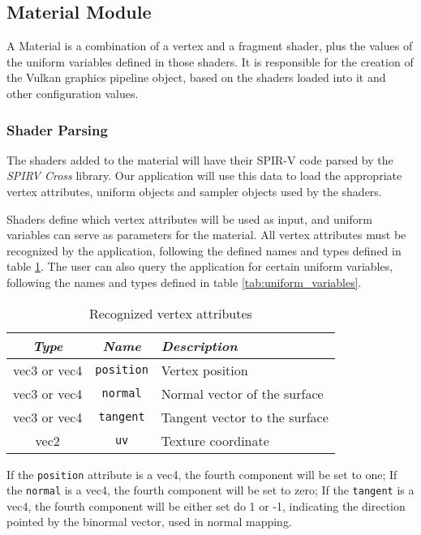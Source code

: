 \subsection{Material Module}
A Material is a combination of a vertex and a fragment shader, plus the values of the uniform variables defined in those shaders. It is responsible for the creation of the Vulkan graphics pipeline object, based on the shaders loaded into it and other configuration values.

\subsubsection{Shader Parsing}
The shaders added to the material will have their SPIR-V code parsed by the \emph{SPIRV Cross} library. Our application will use this data to load the appropriate vertex attributes, uniform objects and sampler objects used by the shaders.

Shaders define which vertex attributes will be used as input, and uniform variables can serve as parameters for the material. All vertex attributes must be recognized by the application, following the defined names and types defined in table \ref{tab:vertex_attributes}. The user can also query the application for certain uniform variables, following the names and types defined in table \ref{tab:uniform_variables}.

\begin{table}[h]
    \centering
    \caption{Recognized vertex attributes}
    \begin{tabular}{|c|c|p{6cm}|}
    \hline
        \textit{Type} & \textit{Name} & \textit{Description} \\
        \hline \hline
        vec3 or vec4 & \texttt{position} & Vertex position \\
        vec3 or vec4 & \texttt{normal} & Normal vector of the surface \\
        vec3 or vec4 & \texttt{tangent} & Tangent vector to the surface \\
        vec2 & \texttt{uv} & Texture coordinate \\
        \hline
    \end{tabular}
    \label{tab:vertex_attributes}
\end{table}

If the \texttt{position} attribute is a vec4, the fourth component will be set to one; If the \texttt{normal} is a vec4, the fourth component will be set to zero; If the \texttt{tangent} is a vec4, the fourth component will be either set do 1 or -1, indicating the direction pointed by the binormal vector, used in normal mapping.

